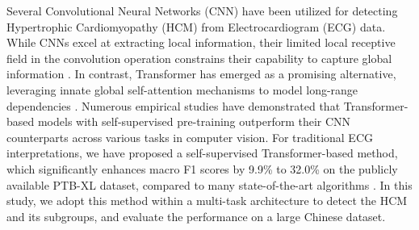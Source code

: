 \documentclass[11pt]{article}
\theoremstyle{definition}
\begin{document}
Several Convolutional Neural Networks (CNN) have been utilized for detecting Hypertrophic Cardiomyopathy (HCM) from Electrocardiogram (ECG) data. While CNNs excel at extracting local information, their limited local receptive field in the convolution operation constrains their capability to capture global information \citep{song2022ctmfnet, yang2021transformer}. In contrast, Transformer has emerged as a promising alternative, leveraging innate global self-attention mechanisms to model long-range dependencies \citep{vaswani2017attention, dosovitskiy2020image}. Numerous empirical studies have demonstrated that Transformer-based models with self-supervised pre-training outperform their CNN counterparts across various tasks in computer vision\citep{matsoukas2021time}. For traditional ECG interpretations, we have proposed a self-supervised Transformer-based method, which significantly enhances macro F1 scores by 9.9\% to 32.0\% on the publicly available PTB-XL dataset, compared to many state-of-the-art algorithms \citep{wagner2020ptb, zhou2023masked}. 
In this study, we adopt this method within a multi-task architecture to detect the HCM and its subgroups, and evaluate the performance on a large Chinese dataset. 




%
\end{document}
